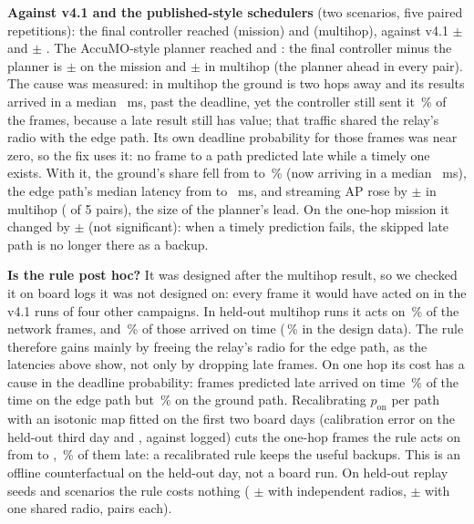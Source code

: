 \documentclass[conference]{IEEEtran}
\begin{document}
\textbf{Against v4.1 and the published-style schedulers} (two scenarios, five paired repetitions): the final controller
reached \BdFinSapMis{} (mission) and \BdFinSapMulti{} (multihop), against v4.1 \BdFinVsVMis{} $\pm$ \BdFinVsVMisCi{} and
\BdFinVsVMulti{} $\pm$ \BdFinVsVMultiCi. The AccuMO-style planner reached \BdAccSapMis{} and \BdAccSapMulti: the final controller minus the planner
is \BdFinVsAccMis{} $\pm$ \BdFinVsAccMisCi{} on the mission and \BdFinVsAccMulti{} $\pm$ \BdFinVsAccMultiCi{} in
multihop (the planner ahead in every pair). The cause was measured: in multihop the ground is
two hops away and its results arrived in a median \BdLapLat~ms, past the deadline, yet the controller still sent it
\BdLapShare\,\% of the frames, because a late result still has value; that traffic shared the relay's radio with the edge
path. Its own deadline probability for those frames was near zero, so the fix uses it: no frame to a path predicted
late while a timely one exists. With it, the ground's share fell from \BdFixLapBefore{} to \BdFixLapAfter\,\% (now
arriving in a median \BdFixLapAfterMs~ms), the edge path's median latency from \BdFixJetBefore{} to \BdFixJetAfter~ms,
and streaming AP rose by \BdFixMulti{} $\pm$ \BdFixMultiCi{} in multihop (\BdFixMultiWins{} of 5 pairs), the size of the
planner's lead. On the one-hop mission it changed by \BdFixMis{} $\pm$ \BdFixMisCi{} (not significant): when a timely
prediction fails, the skipped late path is no longer there as a backup.

\textbf{Is the rule post hoc?} It was designed after the multihop result, so we checked it on board logs it was not
designed on: every frame it would have acted on in the v4.1 runs of four other campaigns. In held-out multihop runs it
acts on \SkHeldMultiShare\,\% of the network frames, and \SkHeldMultiOn\,\% of those arrived on time (\SkDesignMultiOn\,\%
in the design data). The rule therefore gains mainly by freeing the relay's radio for the edge path, as the latencies
above show, not only by dropping late frames. On one hop its cost has a cause in the deadline probability: frames
predicted late arrived on time \RcJetLowOn\,\% of the time on the edge path but \RcLapLowOn\,\% on the ground path.
Recalibrating $p_{\mathrm{on}}$ per path with an isotonic map fitted on the first two board days (calibration error
on the held-out third day \RcPathEceJet{} and \RcPathEceLap, against \RcEceRaw{} logged) cuts the one-hop frames the
rule acts on from \SkOneRaw{} to \SkOneRecal{}, \SkOneRecalLate\,\% of them late: a recalibrated rule keeps the useful
backups. This is an offline counterfactual on the held-out day, not a board run. On held-out replay seeds and scenarios the rule costs
nothing (\SkRepIndep{} $\pm$ \SkRepIndepCi{} with independent radios, \SkRepShared{} $\pm$ \SkRepSharedCi{} with one shared
radio, \SkRepPairs{} pairs each).
\end{document}
